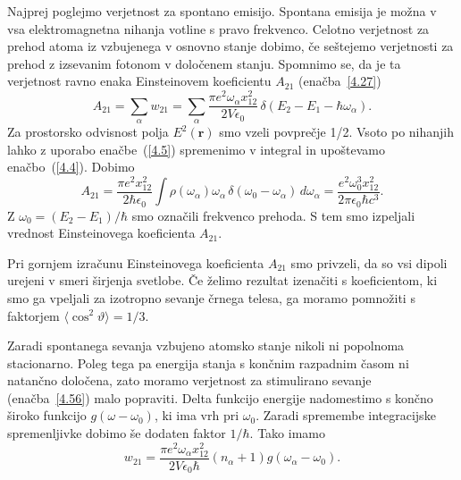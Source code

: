 Najprej poglejmo verjetnost za spontano emisijo. 
Spontana emisija je možna v vsa elektromagnetna nihanja votline s
pravo frekvenco. Celotno verjetnost za prehod atoma iz vzbujenega
v osnovno stanje dobimo, če seštejemo verjetnosti za prehod z izsevanim fotonom 
v določenem stanju. Spomnimo se, da je ta verjetnost ravno enaka 
Einsteinovem koeficientu $A_{21}$ (enačba~\ref{4.27})
\begin{equation}
A_{21}=\sum_{\alpha}w_{21}=\sum_{\alpha}\frac{\pi 
e^{2}\omega_{\alpha}x_{12}^{2}}{2V\epsilon_{0}}\,\delta(E_{2}-E_{1}-\hbar\omega_{\alpha}).
\label{4.57}
\end{equation}
Za prostorsko odvisnost polja $E^{2}(\mathbf{r})$ smo vzeli povprečje
1/2. Vsoto po nihanjih lahko z uporabo enačbe~(\ref{4.5}) spremenimo v integral
in upoštevamo enačbo~(\ref{4.4}). Dobimo
\begin{equation}
A_{21}=\frac{\pi e^{2}x_{12}^{2}}{2\hbar\epsilon_{0}}\int\rho(\omega_{\alpha})\omega_\alpha\, 
\delta(\omega_{0}-\omega_{\alpha})\, d\omega_{\alpha}=\frac{e^{2}\omega_{0}^{3}x_{12}^{2}}{2\pi\epsilon_{0}\hbar c^{3}}.
\label{4.58}
\end{equation}
 Z $\omega_{0}=(E_{2}-E_{1})/\hbar$ smo označili frekvenco prehoda. S tem smo 
 izpeljali vrednost Einsteinovega koeficienta $A_{21}$. 
\begin{remark}
Pri gornjem izračunu Einsteinovega koeficienta $A_{21}$ smo privzeli, da so vsi dipoli urejeni  
 v smeri širjenja svetlobe. Če želimo rezultat izenačiti s koeficientom, ki smo ga vpeljali
 za izotropno sevanje črnega telesa, ga moramo pomnožiti s faktorjem $\langle \cos^2\vartheta
 \rangle = 1/3$.
\end{remark}

Zaradi spontanega sevanja vzbujeno atomsko stanje nikoli ni popolnoma
stacionarno. Poleg tega pa energija stanja s končnim razpadnim časom ni natančno
določena, zato moramo verjetnost za stimulirano sevanje (enačba~\ref{4.56}) malo 
popraviti. Delta funkcijo energije nadomestimo s končno široko  
funkcijo $g(\omega-\omega_0)$, ki ima vrh pri $\omega_{0}$. Zaradi 
spremembe integracijske spremenljivke dobimo še dodaten faktor $1/\hbar$. Tako imamo 
\begin{equation}
w_{21}=\frac{\pi e^{2}\omega_{\alpha}x_{12}^{2}}{2V\epsilon_{0}\hbar}
(n_{\alpha}+1)g(\omega_{\alpha}-\omega_0).
\label{4.59}
\end{equation}


